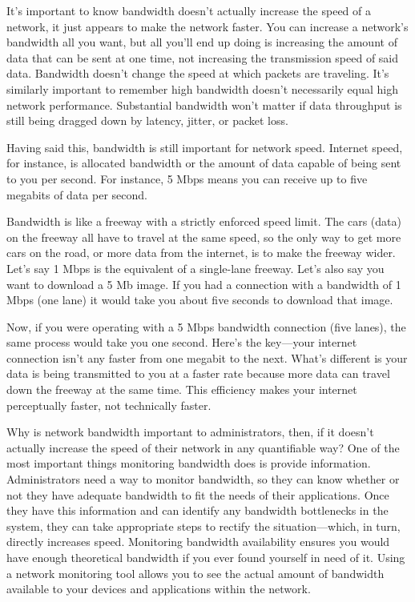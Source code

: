 It’s important to know bandwidth doesn’t actually increase the speed of a network, it just appears to make the network faster. You can increase a network’s bandwidth all you want, but all you’ll end up doing is increasing the amount of data that can be sent at one time, not increasing the transmission speed of said data. Bandwidth doesn’t change the speed at which packets are traveling. It’s similarly important to remember high bandwidth doesn’t necessarily equal high network performance. Substantial bandwidth won’t matter if data throughput is still being dragged down by latency, jitter, or packet loss.

Having said this, bandwidth is still important for network speed. Internet speed, for instance, is allocated bandwidth or the amount of data capable of being sent to you per second. For instance, 5 Mbps means you can receive up to five megabits of data per second.

Bandwidth is like a freeway with a strictly enforced speed limit. The cars (data) on the freeway all have to travel at the same speed, so the only way to get more cars on the road, or more data from the internet, is to make the freeway wider. Let’s say 1 Mbps is the equivalent of a single-lane freeway. Let’s also say you want to download a 5 Mb image. If you had a connection with a bandwidth of 1 Mbps (one lane) it would take you about five seconds to download that image.

Now, if you were operating with a 5 Mbps bandwidth connection (five lanes), the same process would take you one second. Here’s the key—your internet connection isn’t any faster from one megabit to the next. What’s different is your data is being transmitted to you at a faster rate because more data can travel down the freeway at the same time. This efficiency makes your internet perceptually faster, not technically faster.

Why is network bandwidth important to administrators, then, if it doesn’t actually increase the speed of their network in any quantifiable way? One of the most important things monitoring bandwidth does is provide information. Administrators need a way to monitor bandwidth, so they can know whether or not they have adequate bandwidth to fit the needs of their applications. Once they have this information and can identify any bandwidth bottlenecks in the system, they can take appropriate steps to rectify the situation—which, in turn, directly increases speed. Monitoring bandwidth availability ensures you would have enough theoretical bandwidth if you ever found yourself in need of it. Using a network monitoring tool allows you to see the actual amount of bandwidth available to your devices and applications within the network.

